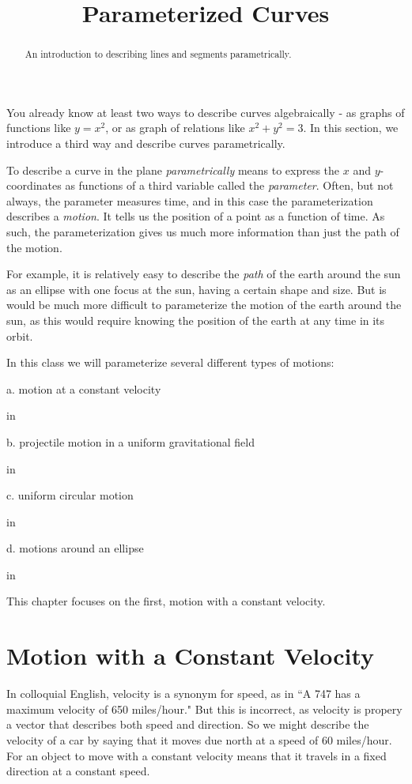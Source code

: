 \documentclass{ximera}
\title{Parameterized Curves}
\newcommand{\pskip}{\vskip 0.1 in}
\begin{document}
\begin{abstract}
An introduction to describing lines and segments parametrically.
\end{abstract}
\maketitle

You already know at least two ways to describe curves algebraically - as graphs of functions like $y=x^2$, or as graph of relations like $x^2 + y^2 = 3$. In this section, we introduce a third way and describe curves parametrically. 

To describe a curve in the plane \emph{parametrically} means to express the $x$ and $y$-coordinates as functions of a third variable called the \emph{parameter}. Often, but not always, the parameter measures time, and in this case the parameterization describes a \emph{motion}. It tells us the position of a point as a function of time. As such, the parameterization gives us much more information than just the path of the motion.

For example, it is relatively easy to describe the \emph{path} of the earth around the sun as an ellipse with one focus at the sun, having a certain shape and size. But is would be much more difficult to parameterize the motion of the earth around the sun, as this would require knowing the position of the earth at any time in its orbit.

In this class we will parameterize several different types of motions:

a. motion at a constant velocity

\pskip

b. projectile motion in a uniform gravitational field

\pskip

c. uniform circular motion

\pskip

d. motions around an ellipse

\pskip

This chapter focuses on the first, motion with a constant velocity.

\section{Motion with a Constant Velocity}

In colloquial English, velocity is a synonym for speed, as in ``A 747 has a maximum velocity of 650 miles/hour." But this is incorrect, as velocity is propery a vector that describes both speed and direction. So we might describe the velocity of a car by saying that it moves due north at a speed of 60 miles/hour. For an object to move with a constant velocity means that it travels in a fixed direction at a constant speed.
\end{document}
